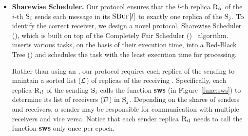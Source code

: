 \begin{itemize}[wide]
\item {\bf Sharewise Scheduler.}
Our \Scrooge{} protocol ensures that the $l$-th replica $\textsc{R}_{{i}{l}}$ of the $i$-th \RSM{} $\textsc{S}_{i}$ sends 
each message in its $\textsc{SBuf}[{l}]$ to exactly one replica of the \RSM{} $\textsc{S}_{j}$.
To identify the correct receiver, we design a novel protocol, Sharewise Scheduler (\SWS{}), which 
is built on top of the Completely Fair Scheduler (\CFS{})~\cite{cfs} algorithm.
\CFS{} inserts various tasks, on the basis of their execution time, into a Red-Black Tree (\RBT) and 
schedules the task with the least execution time for processing.

Rather than using an \RBT{}, our \SWS{} protocol requires each replica of the sending \RSM{} to 
maintain a sorted list ($\mathcal{L}$) of replicas of the receiving \RSM{}.
Specifically, each replica $\textsc{R}_{{i}{l}}$ of the sending \RSM{} $\textsc{S}_{i}$ 
calls the function {\bf sws} (in Figure~\ref{func:sws}) to determine its 
list of receivers ($\mathcal{D}$) in \RSM{} $\textsc{S}_{j}$.
Depending on the shares of senders and receivers, 
a sender may be responsible for communication with multiple receivers and vice versa.
Notice that each sender replica $\textsc{R}_{{i}{l}}$ needs to call the function {\bf sws} only once per epoch. 




\end{itemize}
